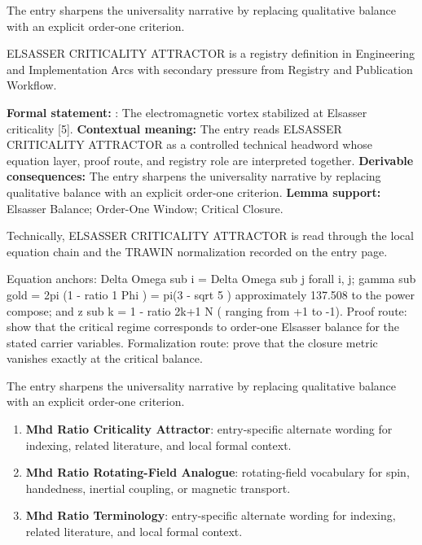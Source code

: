 The entry sharpens the universality narrative by replacing qualitative balance with an explicit order-one criterion.
\clearpage


\begingroup\small
{}
ELSASSER CRITICALITY ATTRACTOR is a registry definition in Engineering and Implementation Arcs with secondary pressure from Registry and Publication Workflow.

\begingroup\footnotesize\setlength{\emergencystretch}{3em}\sloppy
\textbf{Formal statement:} : The electromagnetic vortex stabilized at Elsasser criticality [5]. \textbf{Contextual meaning:} The entry reads ELSASSER CRITICALITY ATTRACTOR as a controlled technical headword whose equation layer, proof route, and registry role are interpreted together. \textbf{Derivable consequences:} The entry sharpens the universality narrative by replacing qualitative balance with an explicit order-one criterion. \textbf{Lemma support:} Elsasser Balance; Order-One Window; Critical Closure.\par
\endgroup

Technically, ELSASSER CRITICALITY ATTRACTOR is read through the local equation chain and the TRAWIN normalization recorded on the entry page.

Equation anchors: Delta Omega sub i = Delta Omega sub j forall i, j; gamma sub gold = 2pi (1 - ratio 1 Phi ) = pi(3 - sqrt 5 ) approximately 137.508 to the power compose; and z sub k = 1 - ratio 2k+1 N ( ranging from +1 to -1). Proof route: show that the critical regime corresponds to order-one Elsasser balance for the stated carrier variables. Formalization route: prove that the closure metric vanishes exactly at the critical balance.

The entry sharpens the universality narrative by replacing qualitative balance with an explicit order-one criterion.
\endgroup

\begin{enumerate}[leftmargin=1.6em,itemsep=6pt,topsep=4pt]
\item \textbf{Mhd Ratio Criticality Attractor}: entry-specific alternate wording for indexing, related literature, and local formal context.
\item \textbf{Mhd Ratio Rotating-Field Analogue}: rotating-field vocabulary for spin, handedness, inertial coupling, or magnetic transport.
\item \textbf{Mhd Ratio Terminology}: entry-specific alternate wording for indexing, related literature, and local formal context.
\end{enumerate}


